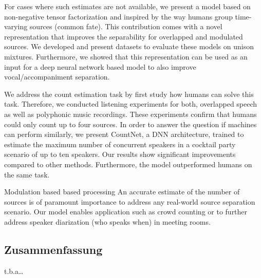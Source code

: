 For cases where such estimates are not available, we present a model based on non-negative tensor factorization and inspired by the way humans group time-varying sources (common fate).
This contribution comes with a novel representation that improves the separability for overlapped and modulated sources.
We developed and present datasets to evaluate these models on unison mixtures.
Furthermore, we showed that this representation can be used as an input for a deep neural network based model to also improve vocal/accompaniment separation.
\par
We address the count estimation task by first study how humans can solve this task. 
Therefore, we conducted listening experiments for both, overlapped speech as well as polyphonic music recordings. 
These experiments confirm that humans could only count up to four sources.
In order to answer the question if machines can perform similarly, we present CountNet, a DNN architecture, trained to estimate the maximum number of concurrent speakers in a cocktail party scenario of up to ten speakers.
Our results show significant improvements compared to other methods. 
Furthermore, the model outperformed humans on the same task.
\par
Modulation based based processing
An accurate estimate of the number of sources is of paramount importance to address any real-world source separation scenario.
Our model enables application such as crowd counting or to further address speaker diarization (who speaks when) in meeting rooms.


\vfill

\begin{otherlanguage}{ngerman}
\chapter*{Zusammenfassung}
t.b.a\dots
\end{otherlanguage}

\endgroup

\vfill
